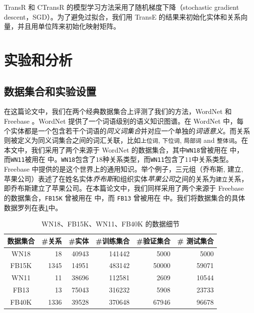     TransR 和 CTransR 的模型学习方法采用了随机梯度下降（stochastic gradient descent，SGD）。为了避免过拟合，我们用 TransE 的结果来初始化实体和关系向量，并且用单位阵来初始化映射矩阵。


    \section{实验和分析}
    \label{sec:experiment}

    \subsection{数据集合和实验设置}
    在这篇论文中，我们在两个经典数据集合上评测了我们的方法，WordNet \cite{miller1995wordnet} 和 Freebase \cite{bollacker2008freebase}。WordNet 提供了一个词语级别的语义知识图谱。在 WordNet 中，每个实体都是一个包含若干个词语的\emph{同义词集合}并对应一个单独的\emph{词语意义}。而关系则被定义为同义词集合之间的词汇关联，比如\texttt{上位词}, \texttt{下位词}, \texttt{局部词} and \texttt{整体词}。在本文中，我们采用了两个来源于 WordNet 的数据集合，其中\texttt{WN18}曾被用在 \cite{bordes2014semantic} 中，而\texttt{WN11}被用在 \cite{socher2013reasoning} 中。\texttt{WN18}包含了$18$种关系类型，而\texttt{WN11}包含了$11$中关系类型。Freebase 中提供的是这个世界上的通用知识。举个例子，三元组（乔布斯, 建立, 苹果公司）表述了在姓名实体\emph{乔布斯}和组织实体\emph{苹果公司}之间的关系为\texttt{建立}关系，即乔布斯建立了苹果公司。在本篇论文中，我们同样采用了两个来源于 Freebase 的数据集合，\texttt{FB15K} 曾被用在 \cite{bordes2014semantic} 中，而 \texttt{FB13} 曾被用在 \cite{socher2013reasoning} 中。我们将数据集合的具体数据罗列在表\ref{table_1:statistics}中。

    \begin{table}[h]
    \small
    \centering
    \caption{WN18、FB15K、WN11、FB40K 的数据细节}
    \label{table_1:statistics}
    \begin{tabular}{|c|rrrrr|}
    \hline
    数据集合 &\#关系& \#实体& \#训练集合& \#验证集合& \# 测试集合\\
    \hline
    WN18  & 18     & 40943  &141442 & 5000  & 5000\\
    FB15K & 1345 & 14951 & 483142 & 50000& 59071\\
    WN11  &11       & 38696 & 112581 & 2609  &10544\\
    FB13   &13       & 75043 &316232  &5908  &23733\\
    FB40K & 1336 & 39528 &370648 &67946&96678\\
    \hline
    \end{tabular}
    \end{table}

